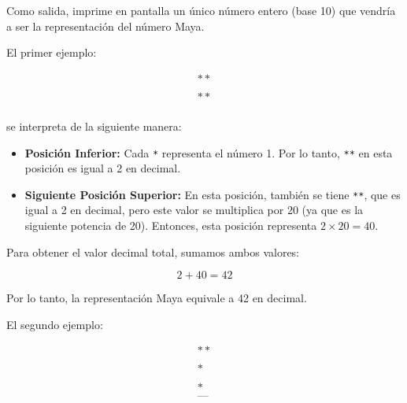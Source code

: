 \outputText

Como salida, imprime en pantalla un \'unico n\'umero entero (base 10) que vendr\'ia a ser la representaci\'on del n\'umero Maya.

\exampleCases

\begin{example}
\end{example}

\explanationText

El primer ejemplo:

\[
\begin{array}{c}
** \\
\\
** \\
\end{array}
\]

se interpreta de la siguiente manera:

\begin{itemize}
    \item \textbf{Posición Inferior:} Cada \texttt{*} representa el número 1. Por lo tanto, \texttt{**} en esta posición es igual a 2 en decimal.
    \item \textbf{Siguiente Posición Superior:} En esta posición, también se tiene \texttt{**}, que es igual a 2 en decimal, pero este valor se multiplica por 20 (ya que es la siguiente potencia de 20). Entonces, esta posición representa $2 \times 20 = 40$.
\end{itemize}

Para obtener el valor decimal total, sumamos ambos valores:

\[
2 + 40 = 42
\]

Por lo tanto, la representación Maya equivale a 42 en decimal.

\newpage
El segundo ejemplo:

\[
\begin{array}{c}
** \\
\\
*
\\
\\
* \\
\texttt{---} \\
\end{array}
\]

